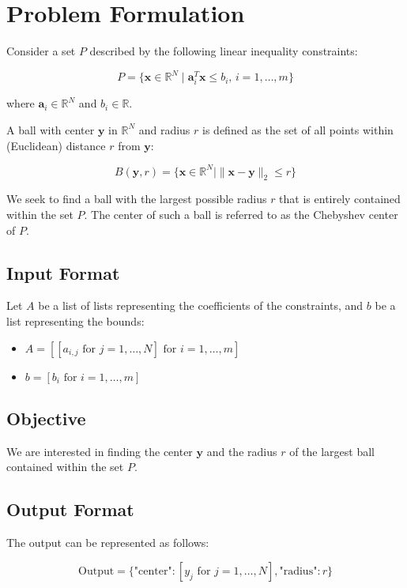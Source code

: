 \documentclass{article}
\begin{document}
\section*{Problem Formulation}

Consider a set \( P \) described by the following linear inequality constraints:

\[
P = \{ \mathbf{x} \in \mathbb{R}^N \mid \mathbf{a}_i^T \mathbf{x} \leq b_i , \, i = 1, \ldots, m \}
\]

where \( \mathbf{a}_i \in \mathbb{R}^N \) and \( b_i \in \mathbb{R} \).

A ball with center \( \mathbf{y} \) in \( \mathbb{R}^N \) and radius \( r \) is defined as the set of all points within (Euclidean) distance \( r \) from \( \mathbf{y} \):

\[
B(\mathbf{y}, r) = \{ \mathbf{x} \in \mathbb{R}^N \mid \|\mathbf{x} - \mathbf{y}\|_2 \leq r \}
\]

We seek to find a ball with the largest possible radius \( r \) that is entirely contained within the set \( P \). The center of such a ball is referred to as the Chebyshev center of \( P \).

\subsection*{Input Format}

Let \( A \) be a list of lists representing the coefficients of the constraints, and \( b \) be a list representing the bounds:

\begin{itemize}
    \item \( A = [[a_{i,j} \text{ for } j = 1, \ldots, N] \text{ for } i = 1, \ldots, m] \)
    \item \( b = [b_i \text{ for } i = 1, \ldots, m] \)
\end{itemize}

\subsection*{Objective}

We are interested in finding the center \( \mathbf{y} \) and the radius \( r \) of the largest ball contained within the set \( P \).

\subsection*{Output Format}

The output can be represented as follows:

\[
\text{Output} = \{ 
    \text{"center"}: [y_j \text{ for } j = 1, \ldots, N], 
    \text{"radius"}: r 
\}
\]
\end{document}

